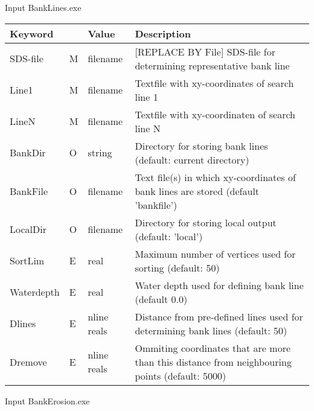 Input BankLines.exe

\begin{tabular}{llll}
Keyword &  & Value & Description \\ \hline
SDS-file & M & filename & [REPLACE BY File] SDS-file for determining representative bank line \\
Line1    & M & filename & Textfile with xy-coordinates of search line 1 \\
LineN    & M & filename & Textfile with xy-coordinaten of search line N \\
BankDir & O & string & Directory for storing bank lines (default: current directory) \\
BankFile & O & filename & Text file(s) in which xy-coordinates of bank lines are stored (default 'bankfile') \\
LocalDir & O & filename & Directory for storing local output (default: 'local') \\
SortLim & E & real & Maximum number of vertices used for sorting (default: 50) \\
Waterdepth & E & real & Water depth used for defining bank line (default 0.0) \\
Dlines & E & nline reals & Distance from pre-defined lines used for determining bank lines (default: 50) \\
Dremove & E & nline reals & Ommiting coordinates that are more than this distance from neighbouring points (default: 5000) \hline
\end{tabular}

Input BankErosion.exe

